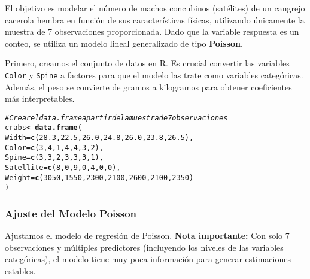\documentclass[paper=letter, fontsize=11pt, draft=false]{scrartcl}\usepackage[]{graphicx}\usepackage[]{xcolor}
\makeatletter
\newcommand{\hlnum}[1]{\textcolor[rgb]{0.686,0.059,0.569}{#1}}%
\newcommand{\hlcom}[1]{\textcolor[rgb]{0.678,0.584,0.686}{\textit{#1}}}%
\newcommand{\hldef}[1]{\textcolor[rgb]{0.345,0.345,0.345}{#1}}%
\newcommand{\hlkwb}[1]{\textcolor[rgb]{0.69,0.353,0.396}{#1}}%
\newcommand{\hlkwc}[1]{\textcolor[rgb]{0.333,0.667,0.333}{#1}}%
\newcommand{\hlkwd}[1]{\textcolor[rgb]{0.737,0.353,0.396}{\textbf{#1}}}%
\newenvironment{kframe}{%
 \def\at@end@of@kframe{}%
 \ifinner\ifhmode%
  \def\at@end@of@kframe{\end{minipage}}%
  \begin{minipage}{\columnwidth}%
 \fi\fi%
 \def\FrameCommand##1{\hskip\@totalleftmargin \hskip-\fboxsep
 \colorbox{shadecolor}{##1}\hskip-\fboxsep
     \hskip-\linewidth \hskip-\@totalleftmargin \hskip\columnwidth}%
 \MakeFramed {\advance\hsize-\width
   \@totalleftmargin\z@ \linewidth\hsize
   \@setminipage}}%
 {\par\unskip\endMakeFramed%
 \at@end@of@kframe}
\newenvironment{knitrout}{}{} %
\numberwithin{equation}{problemcounter} %
\numberwithin{figure}{problemcounter} %
\numberwithin{table}{problemcounter} %
\numberwithin{subsection}{problemcounter}
\makeatother
\begin{document}
El objetivo es modelar el número de machos concubinos (satélites) de un cangrejo cacerola hembra en función de sus características físicas, utilizando únicamente la muestra de 7 observaciones proporcionada. Dado que la variable respuesta es un conteo, se utiliza un modelo lineal generalizado de tipo \textbf{Poisson}. 

Primero, creamos el conjunto de datos en R. Es crucial convertir las variables \texttt{Color} y \texttt{Spine} a factores para que el modelo las trate como variables categóricas. Además, el peso se convierte de gramos a kilogramos para obtener coeficientes más interpretables.

\begin{knitrout}
\color{fgcolor}\begin{kframe}
\begin{alltt}
\hlcom{# Crear el data.frame a partir de la muestra de 7 observaciones}
\hldef{crabs} \hlkwb{<-} \hlkwd{data.frame}\hldef{(}
  \hlkwc{Width} \hldef{=} \hlkwd{c}\hldef{(}\hlnum{28.3}\hldef{,} \hlnum{22.5}\hldef{,} \hlnum{26.0}\hldef{,} \hlnum{24.8}\hldef{,} \hlnum{26.0}\hldef{,} \hlnum{23.8}\hldef{,} \hlnum{26.5}\hldef{),}
  \hlkwc{Color} \hldef{=} \hlkwd{c}\hldef{(}\hlnum{3}\hldef{,} \hlnum{4}\hldef{,} \hlnum{1}\hldef{,} \hlnum{4}\hldef{,} \hlnum{4}\hldef{,} \hlnum{3}\hldef{,} \hlnum{2}\hldef{),}
  \hlkwc{Spine} \hldef{=} \hlkwd{c}\hldef{(}\hlnum{3}\hldef{,} \hlnum{3}\hldef{,} \hlnum{2}\hldef{,} \hlnum{3}\hldef{,} \hlnum{3}\hldef{,} \hlnum{3}\hldef{,} \hlnum{1}\hldef{),}
  \hlkwc{Satellite} \hldef{=} \hlkwd{c}\hldef{(}\hlnum{8}\hldef{,} \hlnum{0}\hldef{,} \hlnum{9}\hldef{,} \hlnum{0}\hldef{,} \hlnum{4}\hldef{,} \hlnum{0}\hldef{,} \hlnum{0}\hldef{),}
  \hlkwc{Weight} \hldef{=} \hlkwd{c}\hldef{(}\hlnum{3050}\hldef{,} \hlnum{1550}\hldef{,} \hlnum{2300}\hldef{,} \hlnum{2100}\hldef{,} \hlnum{2600}\hldef{,} \hlnum{2100}\hldef{,} \hlnum{2350}\hldef{)}
\hldef{)}
\end{alltt}
\end{kframe}
\end{knitrout}

\subsubsection*{Ajuste del Modelo Poisson}

Ajustamos el modelo de regresión de Poisson. \textbf{Nota importante:} Con solo 7 observaciones y múltiples predictores (incluyendo los niveles de las variables categóricas), el modelo tiene muy poca información para generar estimaciones estables.
\end{document}
